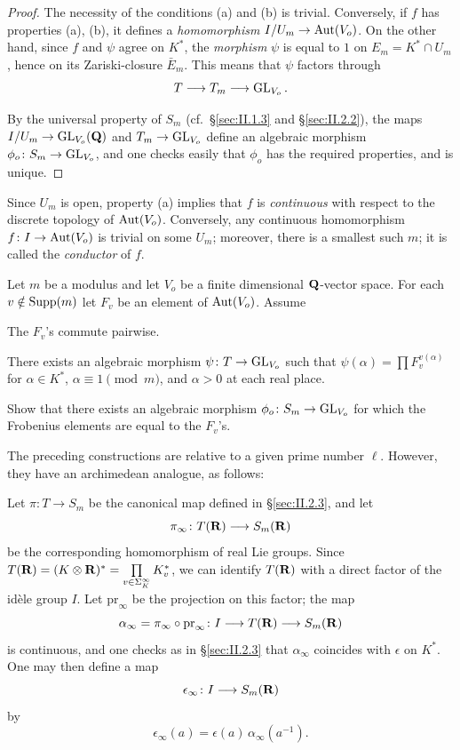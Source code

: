 \begin{proof}
The necessity of the conditions (a) and (b) is trivial.  Conversely, if
$f$ has properties (a), (b), it defines a \emph{homomorphism}
$I/U_m \to \mathrm{Aut}(V_o)$.  On the other hand, since $f$ and $\psi$ agree on
$K^*$, the \emph{morphism} $\psi$ is equal to $1$ on
$E_m = K^* \cap U_m$, hence on its Zariski-closure $\bar{E}_m$.  This
means that $\psi$ factors through
\[
T \longrightarrow T_m \longrightarrow \mathrm{GL}_{V_o}\,.
\]

By the universal property of $S_m$ (cf.~\S\ref{sec:II.1.3} and
\S\ref{sec:II.2.2}), the maps $I/U_m \to \mathrm{GL}_{V_o}(\mathbf{Q})$ and
$T_m \to \mathrm{GL}_{V_o}$ define an algebraic morphism
$\phi_o\colon S_m \to \mathrm{GL}_{V_o}$, and one checks easily that $\phi_o$
has the required properties, and is unique.
\end{proof}


Since $U_m$ is open, property (a) implies that $f$ is
\emph{continuous} with respect to the discrete topology of
$\mathrm{Aut}(V_o)$.  Conversely, any continuous homomorphism
$f\colon I \to \mathrm{Aut}(V_o)$ is trivial on some $U_m$; moreover, there is a
smallest such $m$; it is called the \emph{conductor} of $f$.


Let $m$ be a modulus and let $V_o$ be a finite dimensional $\mathbf{Q}$-vector
space.  For each $v \notin \mathrm{Supp}(m)$ let $F_v$ be an element of
$\mathrm{Aut}(V_o)$.  Assume
\begin{alist}
\item The $F_v$'s commute pairwise.
\item There exists an algebraic morphism $\psi\colon T \to \mathrm{GL}_{V_o}$
such that $\psi(\alpha) = \prod F_v^{v(\alpha)}$ for $\alpha \in K^*$,
$\alpha \equiv 1 \pmod{m}$, and $\alpha > 0$ at each real place.
\end{alist}
Show that there exists an algebraic morphism
$\phi_o\colon S_m \to \mathrm{GL}_{V_o}$ for which the Frobenius elements are
equal to the $F_v$'s.


The preceding constructions are relative to a given prime number
$\ell$.  However, they have an archimedean analogue, as follows:

Let $\pi\colon T \to S_m$ be the canonical map defined in
\S\ref{sec:II.2.3}, and let
\[
\pi_\infty\colon T(\mathbf{R}) \longrightarrow S_m(\mathbf{R})
\]
be the corresponding homomorphism of real Lie groups.  Since
$T(\mathbf{R}) = (K \mathbin{\otimes} \mathbf{R})^* = \prod\limits_{v \in \Sigma_K^\infty} K_v^*$,
we can identify $T(\mathbf{R})$ with a direct factor of the idèle group $I$.
Let $\mathrm{pr}_\infty$ be the projection on this factor; the map
\[
\alpha_\infty = \pi_\infty \circ \mathrm{pr}_\infty\colon I
\longrightarrow T(\mathbf{R}) \longrightarrow S_m(\mathbf{R})
\]
is continuous, and one checks as in \S\ref{sec:II.2.3} that
$\alpha_\infty$ coincides with $\epsilon$ on $K^*$.  One may then define
a map
\[
\epsilon_\infty\colon I \longrightarrow S_m(\mathbf{R})
\]
by
\[
\epsilon_\infty(a) = \epsilon(a)\,\alpha_\infty(a^{-1}).
\]

